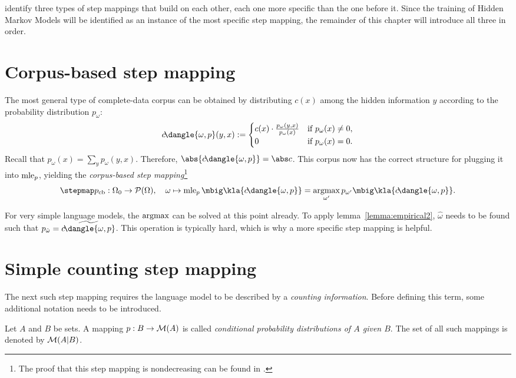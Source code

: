 \cite{bucstuvog15} identify three types of step mappings that build on each
other, each one more specific than the one before it. Since the training of
Hidden Markov Models will be identified as an instance of the most specific
step mapping, the remainder of this chapter will introduce all three in order.

\section{Corpus-based step mapping}

The most general type of complete-data corpus can be obtained by distributing
$c(x)$ among the hidden information $y$ according to the probability
distribution $p_\omega$:
\[
 c\!\dangle{\omega,p}(y,x) := \begin{cases}
  c(x) \cdot \frac{p_\omega(y,x)}{p_\omega(x)} & \text{if } p_\omega(x) \neq 0, \\
  0 & \text{if } p_\omega(x) = 0.
 \end{cases}
\]
Recall that $p_\omega(x) = \sum_y p_\omega(y,x)$. Therefore,
$\abs{c\!\dangle{\omega,p}} = \abs c$. This corpus now has the correct
structure for plugging it into $\operatorname{mle}_p$, yielding the \emph{corpus-based step
mapping}\footnote{The proof that this step mapping is nondecreasing can be
found in \cite[pp.~10]{bucstuvog15}.}
\[
 \stepmap p_\mathrm{cb}: \Omega_0\to\up(\Omega),
 \quad
 \omega \mapsto \mle_p\mbig\kla{c\!\dangle{\omega,p}} = \argmax_{\omega'} p_{\omega'}\mbig\kla{c\!\dangle{\omega,p}}.
\]

For very simple language models, the $\argmax$ can be solved at this point
already. To apply lemma~\ref{lemma:empirical2}, $\hat\omega$ needs to be found
such that $p_{\hat\omega} = \widetilde{c\!\dangle{\omega,p}}$. This operation
is typically hard, which is why a more specific step mapping is helpful.

\section{Simple counting step mapping}

The next such step mapping requires the language model to be described by a
\emph{counting information}. Before defining this term, some additional
notation needs to be introduced.

\begin{definition}
 Let $A$ and $B$ be sets. A mapping $p: B \to \mathcal M(A)$ is called
 \emph{conditional probability distributions of $A$ given $B$}. The set of all
 such mappings is denoted by $\mathcal M(A|B)$.
\end{definition}

